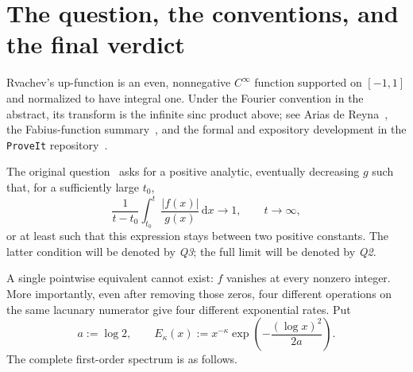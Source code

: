\documentclass[11pt,oneside]{article}
\theoremstyle{definition}
\theoremstyle{remark}
\newcommand{\dd}{\,\mathrm d}
\newcommand{\bigO}{\mathcal O}
\newcommand{\LambertW}{W}
\begin{document}
\begin{abstract}
For almost every fixed dyadic ray the centered logarithm satisfies a CLT and a
two-sided law of the iterated logarithm with asymptotic variance $\pi^2/4$ per
dyadic step.  This corrects a factor $2$ in the variance calculation in the
Aistleitner--Hofer--Larcher source: the sharp coefficient in front of
$\sqrt{n\log\log n}$ is $\pi/\sqrt2$, not $\pi$.

Finally, if
$M_k=\max_{2^k\le x\le2^{k+1}}|f(x)|$, put
$a=\log2$, $\beta=\log(\sqrt3/2)$,
$c=(a/\pi)\sqrt{3/2}$, and $n=k+1$.  Then
\[
 \log M_k=
 -\frac a2k(k+1)-n\log\pi+n\beta
 -\frac{\LambertW(cn)^2+2\LambertW(cn)}{2a}
 +\bigO((\log\log k)^2).
\]
Thus the true annular envelope contains a second log-normal suppression in
$\log\log x$, not a fixed power of $\log x$.  Individual interzero peaks are
still more irregular: immediately after $m2^k$, with $m$ fixed and odd, they
obey an explicit much smaller two-adic asymptotic.  Together these results give
a single consistent resolution of all supplied materials.
\end{abstract}

\tableofcontents
\newpage

\section{The question, the conventions, and the final verdict}
\label{sec:intro}

Rvachev's up-function is an even, nonnegative $C^\infty$ function supported on
$[-1,1]$ and normalized to have integral one.  Under the Fourier convention in
the abstract, its transform is the infinite sinc product above; see
Arias de Reyna~\cite{arias1982}, the Fabius-function summary~\cite{wikipedia},
and the formal and expository development in the \texttt{ProveIt}
repository~\cite{proveit}.

The original question~\cite{mse-source} asks for a positive analytic,
eventually decreasing $g$ such that, for a sufficiently large $t_0$,
\begin{equation}
 \frac1{t-t_0}\int_{t_0}^{t}\frac{|f(x)|}{g(x)}\dd x
 \longrightarrow1,
 \qquad t\to\infty,
 \label{eq:Q2}
\end{equation}
or at least such that this expression stays between two positive constants.
The latter condition will be denoted by \emph{Q3}; the full limit will be
denoted by \emph{Q2}.

A single pointwise equivalent cannot exist: $f$ vanishes at every nonzero
integer.  More importantly, even after removing those zeros, four different
operations on the same lacunary numerator give four different exponential
rates.  Put
\begin{equation}
 a:=\log2,
 \qquad
 E_\kappa(x):=x^{-\kappa}\exp\!\left(-\frac{(\log x)^2}{2a}\right).
 \label{eq:E-kappa}
\end{equation}
The complete first-order spectrum is as follows.
\end{document}
